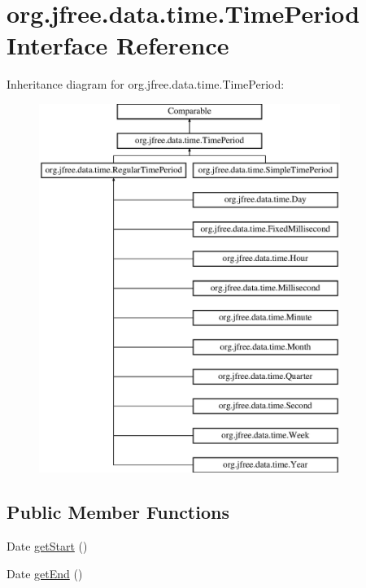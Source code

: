 \hypertarget{interfaceorg_1_1jfree_1_1data_1_1time_1_1_time_period}{}\section{org.\+jfree.\+data.\+time.\+Time\+Period Interface Reference}
\label{interfaceorg_1_1jfree_1_1data_1_1time_1_1_time_period}
Inheritance diagram for org.\+jfree.\+data.\+time.\+Time\+Period\+:\begin{figure}[H]
\begin{center}
\leavevmode
\includegraphics[height=12.000000cm]{interfaceorg_1_1jfree_1_1data_1_1time_1_1_time_period}
\end{center}
\end{figure}
\subsection*{Public Member Functions}
\begin{DoxyCompactItemize}
\item 
Date \mbox{\hyperlink{interfaceorg_1_1jfree_1_1data_1_1time_1_1_time_period_aa8f08870c3b6b95ee24064383521e72e}{get\+Start}} ()
\item 
Date \mbox{\hyperlink{interfaceorg_1_1jfree_1_1data_1_1time_1_1_time_period_aa0fe39753e3af6252b98f5ff9f534f51}{get\+End}} ()
\end{DoxyCompactItemize}


